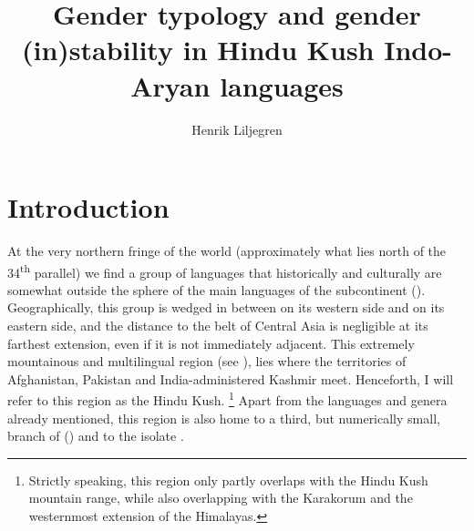 \documentclass[output=collectionpaper]{langsci/langscibook}
\title{%
Gender typology and gender (in)stability in Hindu Kush Indo-Aryan languages
}%
\author{%
Henrik Liljegren
\affiliation{Stockholm University}
}%
\begin{document}
\label{ch:Liljegren}

\section{Introduction}
\label{sec:Lilje:1}

At the very northern fringe of the  world (approximately what lies north of the 34\textsuperscript{th} parallel) we find a group of languages that historically and culturally are somewhat outside the sphere of the main  languages of the subcontinent (\citealt[20--21]{Masica1991}). Geographically, this group is wedged in between  on its western side and  on its eastern side, and the distance to the  belt of Central Asia is negligible at its farthest extension, even if it is not immediately adjacent.
This extremely mountainous and multilingual region (see ), lies where the territories of Afghanistan, Pakistan and India-administered Kashmir meet. Henceforth, I will refer to this region as the Hindu Kush.%
\footnote{
Strictly speaking, this region only partly overlaps with the Hindu Kush mountain range, while also overlapping with the Karakorum and the westernmost extension of the Himalayas.
} %
Apart from the languages and genera already mentioned, this region is also home to  \textendash{} a third, but numerically small, branch of  (\citealt[297--298]{Strand1973}) \textendash{} and to the isolate .
\end{document}
